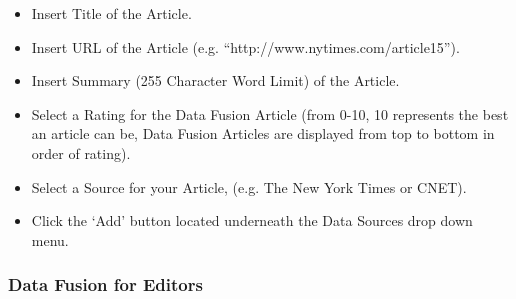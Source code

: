 \documentclass[11pt]{article} %
\begin{document}
\begin{itemize}
\begin{itemize}
	\item Insert Title of the Article.
	\item Insert URL of the Article (e.g. “http://www.nytimes.com/article15”).
	\item Insert Summary (255 Character Word Limit) of the Article.
	\item Select a Rating for the Data Fusion Article (from 0-10, 10 represents the best an article can be, Data Fusion Articles are displayed from top to bottom in order of rating).
	\item Select a Source for your Article, (e.g. The New York Times or CNET).   
	\item Click the ‘Add’ button located underneath the Data Sources drop down menu.
	\end{itemize}
\end{itemize}

\subsubsection{Data Fusion for Editors}
\end{document}
